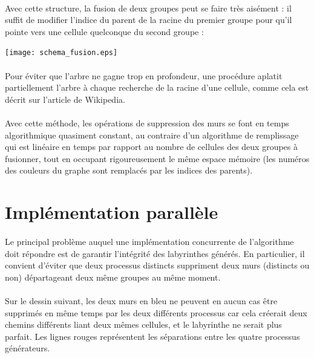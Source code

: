 \documentclass[a4paper,french]{article}
\begin{document}
    \paragraph{} Avec cette structure, la fusion de deux groupes peut se faire
très aisément : il suffit de modifier l'indice du parent de la racine du premier
groupe pour qu'il pointe vers une cellule quelconque du second groupe :

    \begin{center}
        \texttt{[image: schema\_fusion.eps]}
    \end{center}

    \paragraph{} Pour éviter que l'arbre ne gagne trop en profondeur, une
procédure aplatit partiellement l'arbre à chaque recherche de la racine d'une 
cellule, comme cela est décrit sur l'article de Wikipedia.

    \paragraph{} Avec cette méthode, les opérations de suppression des murs se
font en temps algorithmique quasiment constant, au contraire d'un algorithme de
remplissage qui est linéaire en temps par rapport au nombre de cellules des
deux groupes à fusionner, tout en occupant rigoureusement le même espace mémoire
(les numéros des couleurs du graphe sont remplacés par les indices des parents).

\section{Implémentation parallèle}
\label{parallelisme}

    \paragraph{} Le principal problème auquel une implémentation concurrente
de l'algorithme doit répondre est de garantir l'intégrité des labyrinthes
générés.
    \newline En particulier, il convient d'éviter que deux processus distincts
suppriment deux murs (distincts ou non) départageant deux même groupes au même
moment.

    \paragraph{} Sur le dessin suivant, les deux murs en bleu ne peuvent en aucun
cas être supprimés en même temps par les deux différents processus car cela
créerait deux chemins différents liant deux mêmes cellules, et le labyrinthe ne
serait plus parfait. Les lignes rouges représentent les séparations entre les
quatre processus générateurs.
\end{document}
